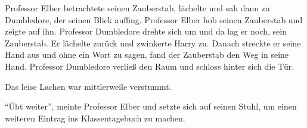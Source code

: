 Professor Elber betrachtete seinen Zauberstab, lächelte und sah dann zu Dumbledore, der seinen Blick auffing. Professor Elber hob seinen Zauberstab und zeigte auf ihn. Professor Dumbledore drehte sich um und da lag er noch, sein Zauberstab. Er lächelte zurück und zwinkerte Harry zu. Danach streckte er seine Hand aus und ohne ein Wort zu sagen, fand der Zauberstab den Weg in seine Hand. Professor Dumbledore verließ den Raum und schloss hinter sich die Tür.

Das leise Lachen war mittlerweile verstummt.

\enquote{Übt weiter}, meinte Professor Elber und setzte sich auf seinen Stuhl, um einen weiteren Eintrag ins Klassentagebuch zu machen.

